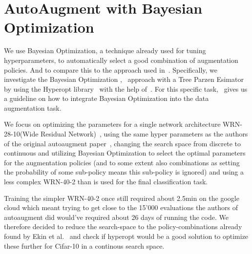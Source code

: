 \documentclass[10pt,twocolumn,letterpaper]{article}
\begin{document}
\section{AutoAugment with Bayesian Optimization}
We use Bayesian Optimization, a technique already used for tuning hyperparameters, to automatically select a good combination of augmentation policies. And to compare this to the approach used in~\cite{Ekin}. Specifically, we investigate the Bayesian Optimization \cite{2018arXiv180702811F},~\cite{Goodfellow-et-al-2016} approach with a Tree Parzen Esimator~\cite{Kaggle_AMT} by using the Hyperopt library~\cite{HyperOpt} with the help of~\cite{BO_Hyperopt}. For this specific task,~\cite{2017arXiv171010564T} gives us a guideline on how to integrate Bayesian Optimization into the data augmentation task.
\par
We focus on optimizing the parameters for a single network architecture WRN-28-10(Wide Residual Network)~\cite{WRN}, using the same hyper parameters as the authors of the original autoaugment paper~\cite{Ekin}, changing the search space from discrete to continuous and utilizing Bayesian Optimization to select the optimal parameters for the augmentation policies (and to some extent also combinations as setting the probability of some sub-policy means this sub-policy is ignored) and using a less complex WRN-40-2 than is used for the final classification task.
\par
Training the simpler WRN-40-2 once still required about 2.5min on the google cloud which meant trying to get close to the 15'000 evaluations the authors of autoaugment did would've required about 26 days of running the code. We therefore decided to reduce the search-space to the policy-combinations already found by Ekin et al.~\cite{Ekin} and check if hyperopt would be a good solution to optimize these further for Cifar-10 in a continous search space.
\end{document}
